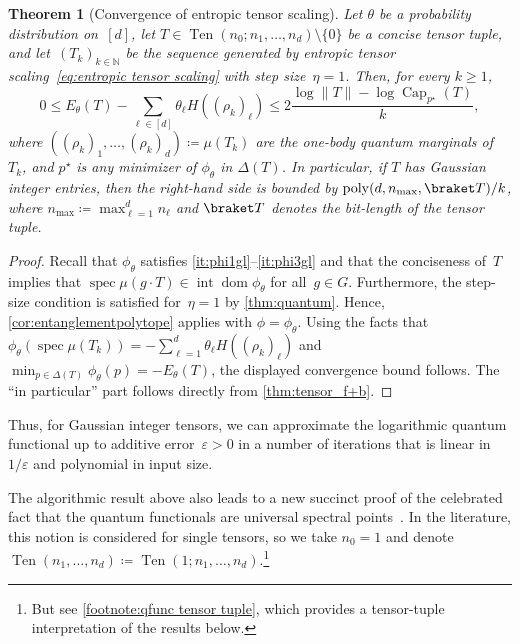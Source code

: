 \documentclass[11pt,letterpaper]{article}
\newtheorem{theorem}{Theorem}[section]
\numberwithin{equation}{section}
\newcommand{\eps}{\varepsilon}
\newcommand{\NN}{\mathbb{N}}
\newcommand{\logqfunc}{E}
\DeclareMathOperator{\poly}{poly}
\DeclareMathOperator{\intr}{int}
\DeclareMathOperator{\dom}{dom}
\DeclareMathOperator{\spec}{spec}
\DeclareMathOperator{\Capacity}{Cap}
\DeclareMathOperator{\Ten}{Ten}
\begin{document}
\begin{theorem}[Convergence of entropic tensor scaling]\label{thm:entropic tensor scaling}
Let $\theta$ be a probability distribution on~$[d]$, let $T \in \Ten(n_0; n_1, \ldots, n_d)\setminus\{0\}$ be a concise tensor tuple, and let~$(T_k)_{k\in\NN}$ be the sequence generated by entropic tensor scaling~\eqref{eq:entropic tensor scaling} with step size~$\eta = 1$.
Then, for every $k\geq1$,
    \[
        0 \leq \logqfunc_\theta(T) - \sum_{\ell \in [d]} \theta_\ell H((\rho_k)_\ell)
        \leq 2 \frac{\log\|T\| - \log\Capacity_{p^\star}(T)}{k},
    \]
    where $((\rho_k)_1, \ldots, (\rho_k)_d) \coloneqq \mu(T_k)$ are the one-body quantum marginals of~$T_k$, and $p^\star$ is any minimizer of $\phi_\theta$ in $\Delta(T)$.
%
    In particular, if $T$ has Gaussian integer entries, then the right-hand side is bounded by $\poly(d, n_{\max}, \braket T)/k$, where $n_{\max} \coloneqq \max_{\ell = 1}^dn_\ell$ and $\braket T$ denotes the bit-length of the tensor tuple.
\end{theorem}
\begin{proof}
Recall that $\phi_\theta$ satisfies \ref{it:phi1gl}--\ref{it:phi3gl} and that the conciseness of~$T$ implies that $\spec\mu(g\cdot T) \in \intr\dom\phi_\theta$ for all~$g \in G$.
Furthermore, the step-size condition is satisfied for~$\eta=1$ by \cref{thm:quantum}.
Hence, \cref{cor:entanglementpolytope} applies with $\phi = \phi_\theta$.
Using the facts that $\phi_\theta(\spec\mu(T_k)) = -\sum_{\ell=1}^d \theta_\ell H((\rho_k)_\ell)$ and $\min_{p \in \Delta(T)}\phi_\theta(p) = -\logqfunc_\theta(T)$, the displayed convergence bound follows.
The ``in particular'' part follows directly from \cref{thm:tensor_f+b}.
\end{proof}

\noindent
Thus, for Gaussian integer tensors, we can approximate the logarithmic quantum functional up to additive error~$\eps>0$ in a number of iterations that is linear in~$1/\eps$ and polynomial in input size.

The algorithmic result above also leads to a new succinct proof of the celebrated fact that the quantum functionals are universal spectral points~\cite{CVZ2018}.
In the literature, this notion is considered for single tensors, so we take $n_0=1$ and denote~$\Ten(n_1,\dots,n_d) \coloneqq \Ten(1;n_1,\dots,n_d)$.\footnote{But see \cref{footnote:qfunc tensor tuple}, which provides a tensor-tuple interpretation of the results below.}
\end{document}
